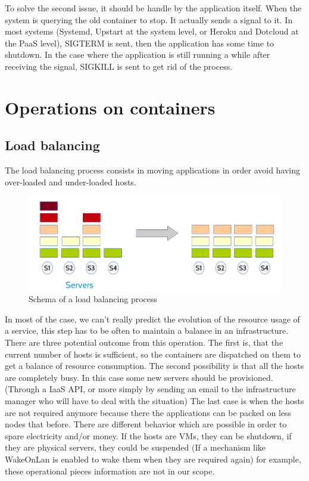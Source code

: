To solve the second issue, it should be handle by the application itself. When
the system is querying the old container to stop. It actually sends a signal to
it.  In most systems (Systemd, Upstart at the system level, or Heroku and
Dotcloud at the PaaS level), SIGTERM is sent, then the application has some
time to shutdown. In the case where the application is still running a while
after receiving the signal, SIGKILL is sent to get rid of the process.

\section{Operations on containers}

\subsection{Load balancing}

The load balancing process consists in moving applications in order avoid having
over-loaded and under-loaded hosts.

\begin{figure}[h!]
	\includegraphics[width=\textwidth]{./Images/loadbalancing.png}
	\caption{Schema of a load balancing process}
\end{figure}

In most of the case, we can't really predict the evolution of the resource usage
of a service, this step has to be often to maintain a balance in an
infrastructure.  There are three potential outcome from this operation. The
first is, that the current number of hosts is sufficient, so the containers are
dispatched on them to get a balance of resource consumption. The second
possibility is that all the hosts are completely busy. In this case some new
servers should be provisioned. (Through a IaaS API, or more simply by sending
an email to the infrastructure manager who will have to deal with the
situation) The last case is when the hosts are not required anymore because
there the applications can be packed on less nodes that before. There are
different behavior which are possible in order to spare electricity and/or
money. If the hosts are VMs, they can be shutdown, if they are physical
servers, they could be suspended (If a mechanism like WakeOnLan is enabled to
wake them when they are required again) for example, these operational pieces
information are not in our scope.

